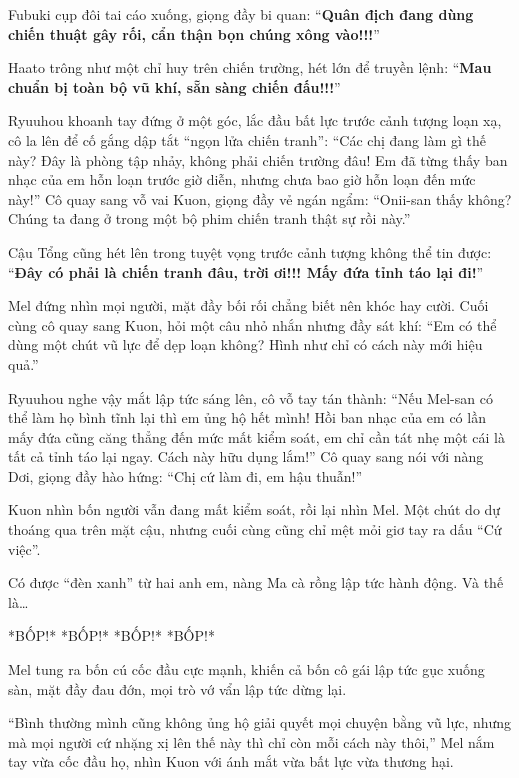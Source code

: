 \documentclass[../main.tex]{subfiles}
\begin{document}
Fubuki cụp đôi tai cáo xuống, giọng đầy bi quan: ``\textbf{Quân địch đang dùng chiến thuật gây rối, cẩn thận bọn chúng xông vào!!!}''

Haato trông như một chỉ huy trên chiến trường, hét lớn để truyền lệnh: ``\textbf{Mau chuẩn bị toàn bộ vũ khí, sẵn sàng chiến đấu!!!}''

Ryuuhou khoanh tay đứng ở một góc, lắc đầu bất lực trước cảnh tượng loạn xạ, cô la lên để cố gắng dập tắt ``ngọn lửa chiến tranh'': ``Các chị đang làm gì thế này? Đây là phòng tập nhảy, không phải chiến trường đâu! Em đã từng thấy ban nhạc của em hỗn loạn trước giờ diễn, nhưng chưa bao giờ hỗn loạn đến mức này!'' Cô quay sang vỗ vai Kuon, giọng đầy vẻ ngán ngẩm: ``Onii-san thấy không? Chúng ta đang ở trong một bộ phim chiến tranh thật sự rồi này.''

Cậu Tổng cũng hét lên trong tuyệt vọng trước cảnh tượng không thể tin được: ``\textbf{Đây có phải là chiến tranh đâu, trời ơi!!! Mấy đứa tỉnh táo lại đi!}''

Mel đứng nhìn mọi người, mặt đầy bối rối chẳng biết nên khóc hay cười. Cuối cùng cô quay sang Kuon, hỏi một câu nhỏ nhắn nhưng đầy sát khí: ``Em có thể dùng một chút vũ lực để dẹp loạn không? Hình như chỉ có cách này mới hiệu quả.''

Ryuuhou nghe vậy mắt lập tức sáng lên, cô vỗ tay tán thành: ``Nếu Mel-san có thể làm họ bình tĩnh lại thì em ủng hộ hết mình! Hồi ban nhạc của em có lần mấy đứa cũng căng thẳng đến mức mất kiểm soát, em chỉ cần tát nhẹ một cái là tất cả tỉnh táo lại ngay. Cách này hữu dụng lắm!'' Cô quay sang nói với nàng Dơi, giọng đầy hào hứng: ``Chị cứ làm đi, em hậu thuẫn!''

Kuon nhìn bốn người vẫn đang mất kiểm soát, rồi lại nhìn Mel. Một chút do dự thoáng qua trên mặt cậu, nhưng cuối cùng cũng chỉ mệt mỏi giơ tay ra dấu ``Cứ việc''.

Có được ``đèn xanh'' từ hai anh em, nàng Ma cà rồng lập tức hành động. Và thế là\dots

*BỐP!* *BỐP!* *BỐP!* *BỐP!*

Mel tung ra bốn cú cốc đầu cực mạnh, khiến cả bốn cô gái lập tức gục xuống sàn, mặt đầy đau đớn, mọi trò vớ vẩn lập tức dừng lại.


``Bình thường mình cũng không ủng hộ giải quyết mọi chuyện bằng vũ lực, nhưng mà mọi người cứ nhặng xị lên thế này thì chỉ còn mỗi cách này thôi,'' Mel nắm tay vừa cốc đầu họ, nhìn Kuon với ánh mắt vừa bất lực vừa thương hại.
\end{document}
